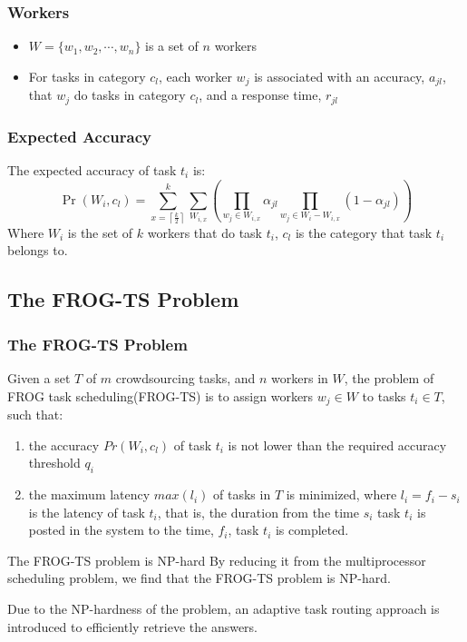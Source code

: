 \documentclass[UTF8]{beamer}
\begin{document}
\begin{frame}
    \frametitle{Workers}
    \begin{itemize}
        \item $W = \{w_1, w_2, \cdots , w_n\}$ is a set of $n$ workers
        \item For tasks in category $c_l$, each worker $w_j$ 
        is associated with an accuracy, $a_{jl}$, that $w_j$ 
        do tasks in category $c_l$, and a response time, $r_{jl}$
    \end{itemize}
\end{frame}

\begin{frame}
    \frametitle{Expected Accuracy}
    The expected accuracy of task $t_i$ is:
    $$\operatorname{Pr}\left(W_{i}, c_{l}\right)=\sum_{x=\left\lceil\frac{k}{2}\right\rceil}^{k} \sum_{W_{i, x}}\left(\prod_{w_{j} \in W_{i, x}} \alpha_{j l} \prod_{w_{j} \in W_{i}-W_{i, x}}\left(1-\alpha_{j l}\right)\right)$$
    Where $W_i$ is the set of $k$ workers that do task $t_i$, 
    $c_l$ is the category that task $t_i$ belongs to.
\end{frame}

\subsection{The FROG-TS Problem}

\begin{frame}
    \frametitle{The FROG-TS Problem}
    Given a set $T$ of $m$ crowdsourcing tasks, 
    and $n$ workers in $W$, the problem of FROG 
    task scheduling(FROG-TS) is to assign workers $w_j \in W$
    to tasks $t_i \in T$, such that:
    \begin{enumerate}
        \item the accuracy $Pr(W_i, c_l)$ of task $t_i$ is not 
        lower than the required accuracy threshold $q_i$
        \item the maximum latency $max(l_i)$ of tasks in $T$ 
        is minimized, where $l_i = f_i - s_i$ is the latency of
        task $t_i$, that is, the duration from the time $s_i$ 
        task $t_i$ is posted in the system to the time, $f_i$, 
        task $t_i$ is completed.
    \end{enumerate}
    \begin{block}{The FROG-TS problem is NP-hard}
        By reducing it from the multiprocessor scheduling problem,
        we find that the FROG-TS problem is NP-hard.
        
        Due to the NP-hardness of the problem, an
        adaptive task routing approach is introduced
        to efficiently retrieve the answers.
    \end{block}
\end{frame}
\end{document}
